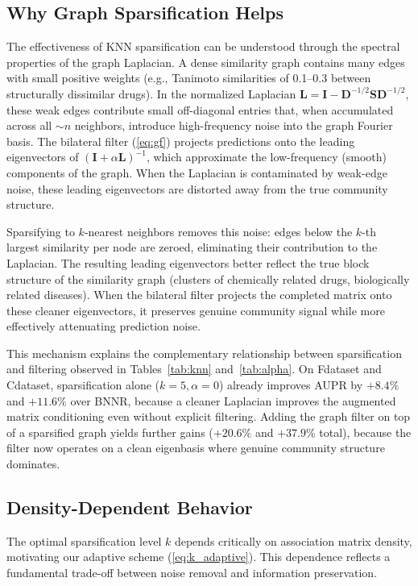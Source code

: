 \documentclass[webpdf,modern,large]{oup-authoring-template}
\begin{document}
\subsection{Why Graph Sparsification Helps}

The effectiveness of KNN sparsification can be understood through the spectral properties of the graph Laplacian. A dense similarity graph contains many edges with small positive weights (e.g., Tanimoto similarities of 0.1--0.3 between structurally dissimilar drugs). In the normalized Laplacian $\mathbf{L} = \mathbf{I} - \mathbf{D}^{-1/2}\mathbf{S}\mathbf{D}^{-1/2}$, these weak edges contribute small off-diagonal entries that, when accumulated across all $\sim n$ neighbors, introduce high-frequency noise into the graph Fourier basis. The bilateral filter (\eqref{eq:gf}) projects predictions onto the leading eigenvectors of $(\mathbf{I}+\alpha\mathbf{L})^{-1}$, which approximate the low-frequency (smooth) components of the graph. When the Laplacian is contaminated by weak-edge noise, these leading eigenvectors are distorted away from the true community structure.

Sparsifying to $k$-nearest neighbors removes this noise: edges below the $k$-th largest similarity per node are zeroed, eliminating their contribution to the Laplacian. The resulting leading eigenvectors better reflect the true block structure of the similarity graph (clusters of chemically related drugs, biologically related diseases). When the bilateral filter projects the completed matrix onto these cleaner eigenvectors, it preserves genuine community signal while more effectively attenuating prediction noise.

This mechanism explains the complementary relationship between sparsification and filtering observed in Tables~\ref{tab:knn} and~\ref{tab:alpha}. On Fdataset and Cdataset, sparsification alone ($k=5, \alpha=0$) already improves AUPR by $+8.4\%$ and $+11.6\%$ over BNNR, because a cleaner Laplacian improves the augmented matrix conditioning even without explicit filtering. Adding the graph filter on top of a sparsified graph yields further gains ($+20.6\%$ and $+37.9\%$ total), because the filter now operates on a clean eigenbasis where genuine community structure dominates.

\subsection{Density-Dependent Behavior}

The optimal sparsification level $k$ depends critically on association matrix density, motivating our adaptive scheme (\eqref{eq:k_adaptive}). This dependence reflects a fundamental trade-off between noise removal and information preservation.
\end{document}

